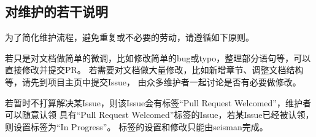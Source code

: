 \subsection{对维护的若干说明}
为了简化维护流程，避免重复或不必要的劳动，请遵循如下原则。

若只是对文档做简单的微调，比如修改简单的bug或typo，整理部分语句等，可以直接修改并提交PR。
若需要对文档做大量修改，比如新增章节、调整文档结构等，请先到项目主页中提交Issue，
由众多维护者一起讨论是否有必要做修改。

若暂时不打算解决某Issue，则该Issue会有标签``Pull Request Welcomed''，维护者可以随意认领
具有``Pull Request Welcomed''标签的Issue，若某Issue已经被认领，则设置标签为``In Progress''。
标签的设置和修改只能由seisman完成。